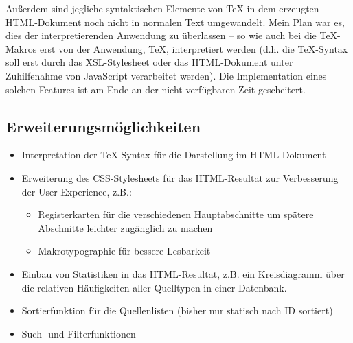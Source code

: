 Außerdem sind jegliche syntaktischen Elemente von \TeX{} in dem erzeugten
HTML-Dokument noch nicht in normalen Text umgewandelt. Mein Plan war es, dies
der interpretierenden Anwendung zu überlassen -- so wie auch bei \BibTeX{} die
\mbox{\TeX-}Makros erst von der Anwendung, \TeX, interpretiert werden (d.h. die
\mbox{\TeX-}Syntax soll erst durch das XSL-Stylesheet oder das HTML-Dokument
unter Zuhilfenahme von JavaScript verarbeitet werden). Die Implementation eines
solchen Features ist am Ende an der nicht verfügbaren Zeit gescheitert.

\subsection{Erweiterungsmöglichkeiten}

\begin{itemize}
    \item Interpretation der \mbox{\TeX-}Syntax für die Darstellung im
        HTML-Dokument
    \item Erweiterung des CSS-Stylesheets für das HTML-Resultat zur Verbesserung
        der User-Experience, z.B.:
        \begin{itemize}
            \item Registerkarten für die verschiedenen Hauptabschnitte um
                spätere Abschnitte leichter zugänglich zu machen
            \item Makrotypographie für bessere Lesbarkeit
        \end{itemize}
    \item Einbau von Statistiken in das HTML-Resultat, z.B. ein Kreisdiagramm
        über die relativen Häufigkeiten aller Quelltypen in einer Datenbank.
    \item Sortierfunktion für die Quellenlisten (bisher nur statisch nach ID
        sortiert)
    \item Such- und Filterfunktionen
\end{itemize}